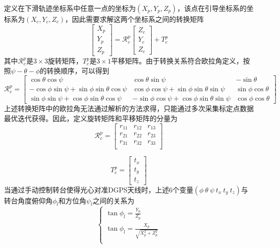 定义在下滑轨迹坐标系中任意一点的坐标为$(X_p, Y_p, Z_p)$，该点在引导坐标系的坐标系为$(X_c, Y_c, Z_c)$，因此需要求解这两个坐标系之间的转换矩阵
\begin{equation}
\left[ {\begin{array}{*{20}{c}}
	{{X_p}} \\ 
	{{Y_p}} \\ 
	{{Z_p}} 
	\end{array}} \right] = \mathcal{R}_c^p\left[ {\begin{array}{*{20}{c}}
	{{Z_{c}}} \\ 
	{{Y_{c}}} \\ 
	{{Z_{c}}} 
	\end{array}} \right] + T_c^p
\end{equation}
其中$\mathcal{R}_c^p$是$3\times3$旋转矩阵，$T_c^p$是$3\times1$平移矩阵。由于转换关系符合欧拉角定义，按照$\psi-\theta-\phi$的转换顺序，可以得到
\begin{equation}
\mathcal{R}_c^p = \begin{bmatrix}
\cos \theta \cos \psi                             & \cos\theta \sin\psi                               & -\sin\theta         \\
-\cos\phi \sin\psi + \sin\phi \sin\theta \cos\psi & \cos\phi \cos\psi + \sin\phi \sin\theta\sin\psi   & \sin\phi \cos\theta \\
\sin\phi \sin\psi + \cos\phi \sin\theta \cos\psi  & -\sin\phi \cos\psi + \cos\phi \sin\theta \sin\psi & \cos\phi \cos\theta
\end{bmatrix}
\end{equation}
上述转换矩阵中的欧拉角无法通过解析的方法求得，只能通过多次采集标定点数据最优迭代获得。因此，定义旋转矩阵和平移矩阵的分量为
\begin{equation}
\mathcal{R}_c^p = \begin{bmatrix}
r_{11} & r_{12} & r_{13}\\
r_{21} & r_{22} & r_{23}\\
r_{31} & r_{32} & r_{33}\\
\end{bmatrix}
\end{equation}

\begin{equation}
T_c^p=\left[ {\begin{array}{*{20}{c}}
	t_x \\ 
	t_y \\ 
	t_z 
	\end{array}} \right]
\end{equation}
当通过手动控制转台使得光心对准DGPS天线时，上述6个变量$(\phi\ \theta\ \psi\ t_x\ t_y\ t_z)$与转台角度俯仰角$\phi_l$和方位角$\psi_l$之间的关系为
\begin{equation}
\left\{ \begin{gathered}
\tan \phi_l = \frac{Y_p}{Z_p} \\
\tan \phi_l = \frac{X_p}{\sqrt{X_p^2+Z_p^2} }\\
\end{gathered}  \right.
\end{equation}

